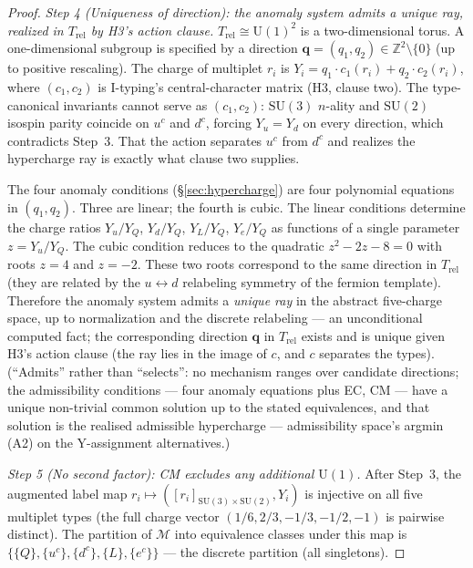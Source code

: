 \documentclass[11pt]{article}
\theoremstyle{definition}
\newcommand{\SU}{\mathrm{SU}}
\newcommand{\U}{\mathrm{U}}
\begin{document}
\begin{proof}
\textit{Step 4 (Uniqueness of direction): the anomaly system admits a
unique ray, realized in $T_{\mathrm{rel}}$ by H3's action clause.}\quad
$T_{\mathrm{rel}} \cong \mathrm{U}(1)^2$ is a two-dimensional torus.
A one-dimensional subgroup is specified by a direction
$\mathbf{q} = (q_1, q_2) \in \mathbb{Z}^2 \setminus \{0\}$ (up to
positive rescaling).  The charge of multiplet $r_i$ is
$Y_i = q_1 \cdot c_1(r_i) + q_2 \cdot c_2(r_i)$, where
$(c_1, c_2)$ is I-typing's central-character matrix (H3, clause two).
The type-canonical invariants cannot serve as $(c_1, c_2)$: $\SU(3)$
$n$-ality and $\SU(2)$ isospin parity coincide on $u^c$ and $d^c$,
forcing $Y_u = Y_d$ on every direction, which contradicts Step~3.
That the action separates $u^c$ from $d^c$ and realizes the
hypercharge ray is exactly what clause two supplies.

The four anomaly conditions (\S\ref{sec:hypercharge}) are four
polynomial equations in $(q_1, q_2)$.  Three are linear; the
fourth is cubic.  The linear conditions determine the charge
ratios $Y_u/Y_Q$, $Y_d/Y_Q$, $Y_L/Y_Q$, $Y_e/Y_Q$
as functions of a single parameter $z = Y_u/Y_Q$.  The cubic
condition reduces to the quadratic $z^2 - 2z - 8 = 0$ with roots
$z = 4$ and $z = -2$.  These two roots correspond to the same
direction in $T_{\mathrm{rel}}$ (they are related by the
$u \leftrightarrow d$ relabeling symmetry of the fermion template).
Therefore the anomaly system admits a \emph{unique ray} in the
abstract five-charge space, up to normalization and the discrete
relabeling --- an unconditional computed fact; the corresponding
direction $\mathbf{q}$ in $T_{\mathrm{rel}}$ exists and is unique
given H3's action clause (the ray lies in the image of $c$, and $c$
separates the types).  (``Admits'' rather than ``selects'': no
mechanism ranges over candidate directions; the admissibility
conditions --- four anomaly equations plus EC, CM --- have a unique
non-trivial common solution up to the stated equivalences, and
that solution is the realised admissible hypercharge --- admissibility
space's argmin (A2) on the Y-assignment alternatives.)

\textit{Step 5 (No second factor): CM excludes any additional
$\U(1)$.}\quad
After Step~3, the augmented label map
$r_i \mapsto ([r_i]_{\SU(3) \times \SU(2)}, Y_i)$ is injective on
all five multiplet types (the full charge vector
$(1/6, 2/3, -1/3, -1/2, -1)$ is pairwise distinct).  The partition of
$\mathcal{M}$ into equivalence classes under this map is
$\{\{Q\}, \{u^c\}, \{d^c\}, \{L\}, \{e^c\}\}$ --- the discrete
partition (all singletons).


\end{proof}
\end{document}
